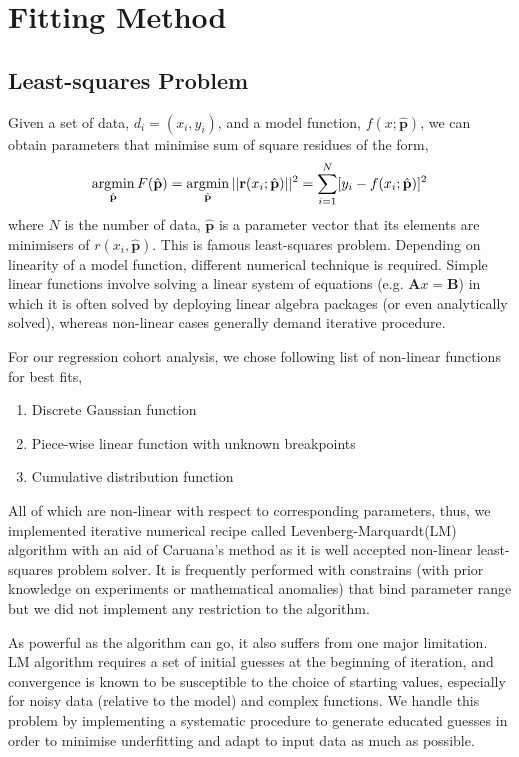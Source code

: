\documentclass{article}
\newcommand{\enterProblemHeader}[1]{
}
\newcommand{\exitProblemHeader}[1]{
}
\newcounter{homeworkProblemCounter} %
\newcommand{\homeworkProblemName}{}
\newenvironment{homeworkProblem}[1][Problem \arabic{homeworkProblemCounter}]{ %
\stepcounter{homeworkProblemCounter} %
\renewcommand{\homeworkProblemName}{#1} %
\section{\homeworkProblemName} %
\enterProblemHeader{\homeworkProblemName} %
}{
\exitProblemHeader{\homeworkProblemName} %
}
\begin{document}
\begin{homeworkProblem}[Fitting Method]
\label{section:method_details}
\subsection{Least-squares Problem}
Given a set of data, $d_i = (x_i, y_i)$, and a model function, $f(x;\hat{\mathbf{p}})$, we can obtain parameters that minimise sum of square residues of the form,
\begin{equation}
    \operatornamewithlimits{argmin}\limits_{\hat{\mathbf{p}}} F(\hat{\mathbf{p}}) = \operatornamewithlimits{argmin}\limits_{\hat{\mathbf{p}}} ||\mathbf{r}(x_i;\hat{\mathbf{p}})||^2 = \sum_{i=1}^{N} [y_i - f(x_i;\hat{\mathbf{p}})]^2
\end{equation}
where $N$ is the number of data, $\hat{\mathbf{p}}$ is a parameter vector that its elements are minimisers of $r(x_i,\hat{\mathbf{p}})$. This is famous least-squares problem. Depending on linearity of a model function, different numerical technique is required. Simple linear functions involve solving a linear system of equations (e.g. $\mathbf{A}x = \mathbf{B}$) in which it is often solved by deploying linear algebra packages (or even analytically solved), whereas non-linear cases generally demand iterative procedure.

For our regression cohort analysis, we chose following list of non-linear functions for best fits,
\begin{enumerate}
    \item Discrete Gaussian function
    \item Piece-wise linear function with unknown breakpoints
    \item Cumulative distribution function
\end{enumerate}
All of which are non-linear with respect to corresponding parameters, thus, we implemented iterative numerical recipe called Levenberg-Marquardt(LM) algorithm \cite{Croeze, Griva, Madsen} with an aid of Caruana's method \cite{Guo, Pastuchova} as it is well accepted non-linear least-squares problem solver. It is frequently performed with constrains (with prior knowledge on experiments or mathematical anomalies) that bind parameter range but we did not implement any restriction to the algorithm.

As powerful as the algorithm can go, it also suffers from one major limitation. LM algorithm requires a set of initial guesses at the beginning of iteration, and convergence is known to be susceptible to the choice of starting values, especially for noisy data (relative to the model) and complex functions. We handle this problem by implementing a systematic procedure to generate educated guesses in order to minimise underfitting and adapt to input data as much as possible.


\end{homeworkProblem}
\end{document}
